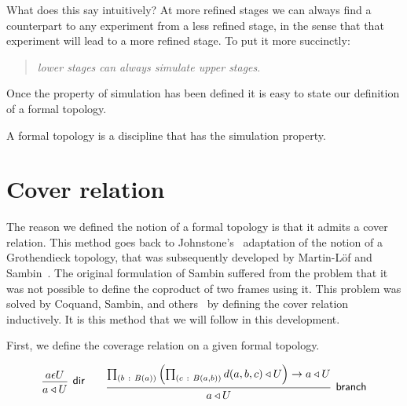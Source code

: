 What does this say intuitively? At more refined stages we can always find a counterpart to
any experiment from a less refined stage, in the sense that that experiment will lead to a
more refined stage. To put it more succinctly:
\begin{quote}
  \emph{lower stages can always simulate upper stages}.
\end{quote}

Once the property of simulation has been defined it is easy to state our
definition of a formal topology.
\begin{defn}
  A formal topology is a discipline that has the simulation property.
\end{defn}

\section{Cover relation}

 The reason we defined the
notion of a formal topology is that it admits a cover relation. This method goes back to
Johnstone's~\cite{stone-spaces} adaptation of the notion of a Grothendieck topology, that
was subsequently developed by Martin-L\"{o}f and Sambin~\cite{int-formal-spaces}. The
original formulation of Sambin suffered from the problem that it was not possible to
define the coproduct of two frames using it. This problem was solved by Coquand, Sambin,
and others~\cite{coq-sambin} by defining the cover relation inductively. It is this method
that we will follow in this development.

First, we define the coverage relation on a given formal topology.
\begin{defn}
  \[
  \begin{prooftree}
    \hypo{ a \epsilon U }
    \infer1[\textsf{dir}]{\covers{a}{U}}
  \end{prooftree}
  \qquad
  \begin{prooftree}
    \hypo{
      \pity{b}{B(a)}{\left( \pity{c}{B(a, b)}{d(a, b, c) \triangleleft U} \right) \rightarrow a \triangleleft U}
    }
    \infer1[\textsf{branch}]{\covers{a}{U}}
  \end{prooftree}
  \]
\end{defn}


